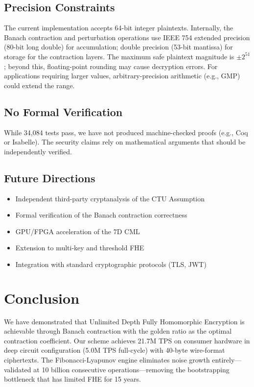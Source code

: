 \documentclass[11pt,a4paper]{article}
\begin{document}
\subsection{Precision Constraints}

The current implementation accepts 64-bit integer plaintexts. Internally, the Banach contraction and perturbation operations use IEEE 754 extended precision (80-bit long double) for accumulation; double precision (53-bit mantissa) for storage for the contraction layers. The maximum safe plaintext magnitude is $\pm 2^{51}$; beyond this, floating-point rounding may cause decryption errors. For applications requiring larger values, arbitrary-precision arithmetic (e.g., GMP) could extend the range.

\subsection{No Formal Verification}

While 34,084 tests pass, we have not produced machine-checked proofs (e.g., Coq or Isabelle). The security claims rely on mathematical arguments that should be independently verified.

\subsection{Future Directions}

\begin{itemize}
    \item Independent third-party cryptanalysis of the CTU Assumption
    \item Formal verification of the Banach contraction correctness
    \item GPU/FPGA acceleration of the 7D CML
    \item Extension to multi-key and threshold FHE
    \item Integration with standard cryptographic protocols (TLS, JWT)
\end{itemize}

\section{Conclusion}
\label{sec:conclusion}

We have demonstrated that Unlimited Depth Fully Homomorphic Encryption is achievable through Banach contraction with the golden ratio as the optimal contraction coefficient. Our scheme achieves 21.7M TPS on consumer hardware in deep circuit configuration (5.0M TPS full-cycle) with 40-byte wire-format ciphertexts. The Fibonacci-Lyapunov engine eliminates noise growth entirely---validated at 10 billion consecutive operations---removing the bootstrapping bottleneck that has limited FHE for 15 years.
\end{document}
